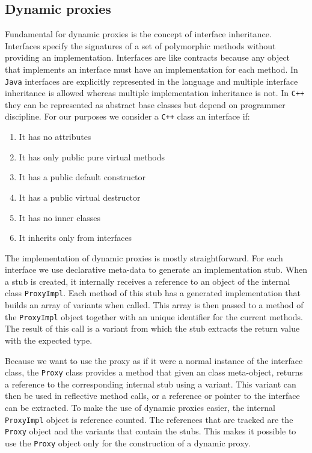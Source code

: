 \subsection{Dynamic proxies}

Fundamental for dynamic proxies is the concept of interface inheritance. Interfaces specify the signatures of a set of polymorphic
methods without providing an implementation. Interfaces are like contracts because any object that implements an interface
must have an implementation for each method. In \texttt{Java} interfaces are explicitly represented in the language and multiple
interface inheritance is allowed whereas multiple implementation inheritance is not. In \texttt{C++} they can be represented as abstract
base classes but depend on programmer discipline. For our purposes we consider a \texttt{C++} class an interface if:

\begin{enumerate}
 \item It has no attributes
 \item It has only public pure virtual methods
 \item It has a public default constructor
 \item It has a public virtual destructor
 \item It has no inner classes
 \item It inherits only from interfaces
\end{enumerate}

The implementation of dynamic proxies is mostly straightforward. For each interface we use declarative meta-data
to generate an implementation stub. When a stub is created, it internally receives a reference to an object of
the internal class \texttt{ProxyImpl}. Each method of this stub has a generated implementation that builds
an array of variants when called. This array is then passed to a method of the \texttt{ProxyImpl} object together
with an unique identifier for the current methods. The result of this call is a variant from which the stub
extracts the return value with the expected type.

Because we want to use the proxy as if it were a normal instance of the interface class, the \texttt{Proxy} class
provides a method that given an class meta-object, returns a reference to the corresponding internal stub using a
variant. This variant can then be used in reflective method calls, or a reference or pointer to the interface can
be extracted. To make the use of dynamic proxies easier, the internal \texttt{ProxyImpl} object is reference counted.
The references that are tracked are the \texttt{Proxy} object and the variants that contain the stubs. This makes
it possible to use the \texttt{Proxy} object only for the construction of a dynamic proxy.


